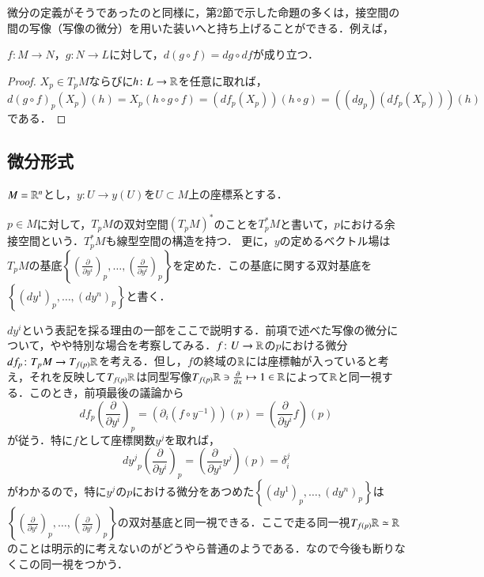 微分の定義がそうであったのと同様に，第2節で示した命題の多くは，接空間の間の写像（写像の微分）を用いた装いへと持ち上げることができる．例えば，

\begin{thm}[合成則]
$f \colon M \to N$，$g \colon N \to L$に対して，$d(g \circ f) = dg \circ df$が成り立つ．
\end{thm}

\begin{proof}
$X_p \in T_pM$ならびに$h \colon L \to \mathbb{R}$を任意に取れば，$d(g \circ f)_p(X_p)(h) = X_p(h \circ g \circ f) = (df_p(X_p))(h \circ g) = ((dg_p)(df_p(X_p)))(h)$である．
\end{proof}

\subsection{微分形式}

$M = \mathbb{R}^n$とし，$y \colon U \to y(U)$を$U \subset M$上の座標系とする．

\begin{defi}
$p \in M$に対して，$T_pM$の双対空間$(T_pM)^*$のことを$T_p^*M$と書いて，$p$における余接空間という．$T_p^*M$も線型空間の構造を持つ．
更に，$y$の定めるベクトル場は$T_pM$の基底$\left\{ \left(\frac{\partial}{\partial y^i}\right)_p,\dots, \left(\frac{\partial}{\partial y^i}\right)_p \right\}$を定めた．この基底に関する双対基底を$\left\{ (dy^1)_p,\dots, \left(dy^n\right)_p \right\}$と書く．
\end{defi}

$dy^i$という表記を採る理由の一部をここで説明する．前項で述べた写像の微分について，やや特別な場合を考察してみる．$f \colon U \to \mathbb{R}$の$p$における微分$df_p \colon T_pM \to T_{f(p)}\mathbb{R}$を考える．但し，$f$の終域の$\mathbb{R}$には座標軸が入っていると考え，それを反映して$T_{f(p)} \mathbb{R}$は同型写像$T_{f(p)} \mathbb{R} \ni \frac{\partial}{\partial x} \mapsto 1 \in \mathbb{R}$によって$\mathbb{R}$と同一視する．このとき，前項最後の議論から
\begin{equation}
df_p \left( \frac{\partial}{\partial y^i} \right)_p = \left( \partial_i (f \circ y^{-1}) \right) (p) = \left( \frac{\partial}{\partial y^i} f \right) (p)
\end{equation}が従う．特に$f$として座標関数$y^j$を取れば，
\begin{equation}
{dy^j}_p \left( \frac{\partial}{\partial y^i} \right)_p = \left( \frac{\partial}{\partial y^i} y^j \right) (p) = \delta_i^j
\end{equation}がわかるので，特に$y^j$の$p$における微分をあつめた$\left\{ (dy^1)_p,\dots, \left(dy^n\right)_p \right\}$は$\left\{ \left(\frac{\partial}{\partial y^i}\right)_p,\dots, \left(\frac{\partial}{\partial y^i}\right)_p \right\}$の双対基底と同一視できる．ここで走る同一視$T_{f(p)} \mathbb{R} \simeq \mathbb{R}$のことは明示的に考えないのがどうやら普通のようである．なので今後も断りなくこの同一視をつかう．

